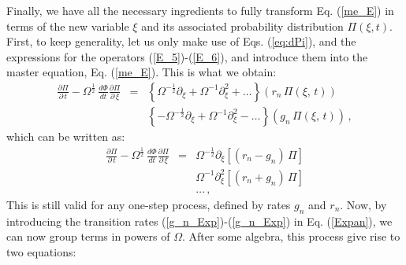 Finally, we have all the necessary ingredients to fully transform Eq. (\ref{me_E}) in terms of the new variable $\xi$ and its associated probability distribution $\Pi(\xi,t)$. First, to keep generality, let us only make use of Eqs. (\ref{eq:dPi}), and the expressions for the operators (\ref{E_5})-(\ref{E_6}), and introduce them into the master equation, Eq. (\ref{me_E}). This is what we obtain:
\begin{eqnarray}
	\frac{\partial\Pi}{\partial\,t}-\Omega^{\frac{1}{2}}\,\frac{d\Phi}{dt}\frac{\partial\Pi}{\partial\,\xi} & = & \left\{\Omega^{-\frac{1}{2}}\partial_{\xi}+\Omega^{-1}\partial_{\xi}^2+\dots\right\}(r_n\,\Pi(\xi,\,t))\nonumber\\
	&   & \left\{-\Omega^{-\frac{1}{2}}\partial_{\xi}+\Omega^{-1}\partial_{\xi}^2-\dots\right\}(g_n\,\Pi(\xi,\,t))\,,
\end{eqnarray}
which can be written as:
\begin{eqnarray}
	\label{Expan}
	\frac{\partial\Pi}{\partial\,t}-\Omega^{\frac{1}{2}}\,\frac{d\Phi}{dt}\frac{\partial\Pi}{\partial\,\xi} & = &\Omega^{-\frac{1}{2}}\partial_{\xi}\left[(r_n-g_n)\,\Pi\right]\nonumber\\
	&   &\Omega^{-1}\partial_{\xi}^2\left[(r_n+g_n)\,\Pi\right]\nonumber\\
	&   &\dots\,,
\end{eqnarray}
This is still valid for any one-step process, defined by rates $g_n$ and $r_n$. Now, by introducing the transition rates (\ref{g_n_Exp})-(\ref{g_n_Exp}) in Eq. (\ref{Expan}), we can now group terms in powers of $\Omega$. After some algebra, this process give rise to two equations:
